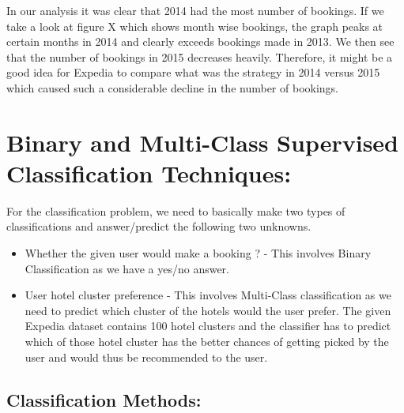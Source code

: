 \documentclass[conference]{IEEEtran}
\begin{document}
In our analysis it was clear that 2014 had the most number of bookings. If we take a look at figure X which shows month wise bookings, the graph peaks at certain months in 2014 and clearly exceeds bookings made in 2013. We then see that the number of bookings in 2015 decreases heavily. Therefore, it might be a good idea for Expedia to compare what was the strategy in 2014 versus 2015 which caused such a considerable decline in the number of bookings.


\section{\textbf{Binary and Multi-Class Supervised Classification Techniques:}}
For the classification problem, we need to basically make two types of classifications and answer/predict the following two unknowns.
\begin{itemize}
\item Whether the given user would make a booking ? - This involves Binary Classification as we have a yes/no answer.
\item User hotel cluster preference - This involves Multi-Class classification as we need to predict which cluster of the hotels would the user prefer. The given Expedia dataset contains 100 hotel clusters and the classifier has to predict which of those hotel cluster has the better chances of getting picked by the user and would thus be recommended to the user.
\end{itemize}

\subsection{Classification Methods:}
\end{document}
